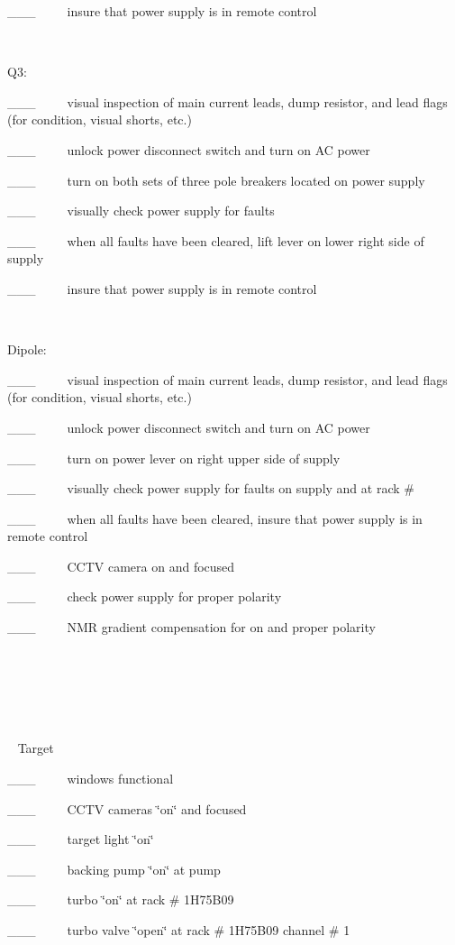\_\_\_~~~~~insure that power supply is in remote control

~

Q3:

\_\_\_~~~~~visual inspection of main current leads, dump resistor, and lead
flags (for condition, visual shorts, etc.)

\_\_\_~~~~~unlock power disconnect switch and turn on AC power

\_\_\_~~~~~turn on both sets of three pole breakers located on power supply

\_\_\_~~~~~visually check power supply for faults

\_\_\_~~~~~when all faults have been cleared, lift lever on lower right side
of supply

\_\_\_~~~~~insure that power supply is in remote control

~

Dipole:

\_\_\_~~~~~visual inspection of main current leads, dump resistor, and lead
flags (for condition, visual shorts, etc.)

\_\_\_~~~~~unlock power disconnect switch and turn on AC power

\_\_\_~~~~~turn on power lever on right upper side of supply

\_\_\_~~~~~visually check power supply for faults on supply and at rack \#

\_\_\_~~~~~when all faults have been cleared, insure that power supply is in
remote control

\_\_\_~~~~~CCTV camera on and focused

\_\_\_~~~~~check power supply for proper polarity 

\_\_\_~~~~~NMR gradient compensation for on and proper polarity

~

~

~

~ Target

\_\_\_~~~~~windows functional~~~~~~

\_\_\_~~~~~CCTV cameras \char`\"{}on\char`\"{} and focused

\_\_\_~~~~~target light \char`\"{}on\char`\"{} 

\_\_\_~~~~~backing pump \char`\"{}on\char`\"{} at pump

\_\_\_~~~~~turbo \char`\"{}on\char`\"{} at rack \# 1H75B09

\_\_\_~~~~~turbo valve \char`\"{}open\char`\"{} at rack \# 1H75B09 channel \#
1

